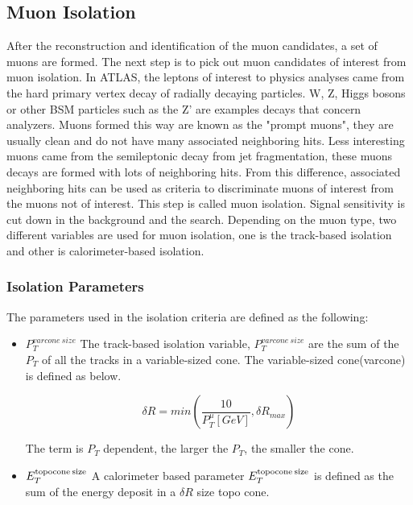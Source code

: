 \subsection{Muon Isolation}
After the reconstruction and identification of the muon candidates, a set of muons are formed. The next step is to pick out muon candidates of interest from muon isolation. In ATLAS, the leptons of interest to physics analyses came from the hard primary vertex decay of radially decaying particles. W, Z, Higgs bosons or other BSM particles such as the Z' are examples decays that concern analyzers. Muons formed this way are known as the "prompt muons", they are usually clean and do not have many
associated neighboring hits. Less interesting muons came from the semileptonic decay from jet fragmentation, these muons decays are formed with lots of neighboring hits. From this difference, associated neighboring hits can be used as criteria to discriminate muons of interest from the muons not of interest. This step is called muon isolation. Signal sensitivity is cut down in the background and the search. Depending on the muon type, two different variables are used for muon isolation, one is the track-based isolation and other is calorimeter-based isolation.

\subsubsection*{Isolation Parameters}
The parameters used in the isolation criteria are defined as the following:
\begin{itemize}
    \item  $P_{T}^{varcone\:size}$ \newline
        The track-based isolation variable, $P_{T}^{varcone\:size}$ are the sum of the $P_{T}$ of all the tracks in a variable-sized cone. The variable-sized cone(varcone) is defined as below.

    
\begin{equation}
 \delta R = min(\frac{10}{P^{\mu}_{T}[GeV]}, \delta R_{max}) 
 \end{equation}

The term is $P_{T}$ dependent, the larger the $P_{T}$, the smaller the cone. 
    \item $E^{\textrm{topocone\:size}}_{T}$ \newline
        A calorimeter based parameter $E^{\textrm{topocone\:size}}_T$ is defined as the sum of the energy deposit in a $\delta R$ size topo cone. 

\end{itemize}

